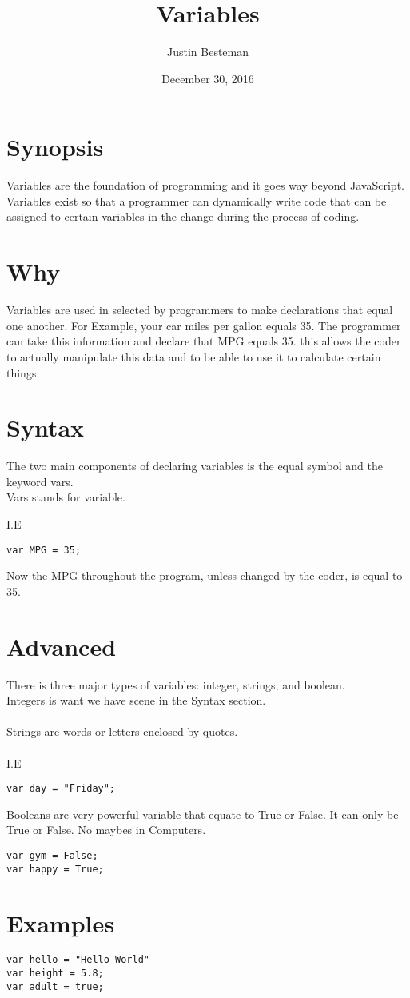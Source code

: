\documentclass[12pt, letterpaper]{article}
\title{Variables}
\author{Justin Besteman}
\date{December 30, 2016}
\begin{document}
\maketitle


\section*{Synopsis}

	 Variables are the foundation of programming and it goes way beyond JavaScript. Variables exist so that a programmer can dynamically write code that can be assigned to certain variables in the change during the process of coding. 

\section*{Why}

Variables are used in selected by programmers to make declarations that equal one another.  For Example, your car miles per gallon equals 35. The programmer can take this information and declare that MPG equals 35.  this allows the coder to actually manipulate this data and to be able to use it to calculate certain things. 

\section*{Syntax}

The two main components of declaring variables is the equal symbol and the keyword vars.\\
Vars stands for variable. 

I.E 

\begin{lstlisting}
var MPG = 35;
\end{lstlisting}
Now the MPG throughout the program, unless changed by the coder, is equal to 35.

\section*{Advanced}

There is three major types of variables: integer, strings, and boolean.\\
Integers is want we have scene in the Syntax section.\\ \\
Strings are words or letters enclosed by quotes.\\ \\
I.E \\
\begin{lstlisting}
var day = "Friday";
\end{lstlisting}
Booleans are very powerful variable that equate to True or False. It can only be True or False. No maybes in Computers.

\begin{lstlisting}
var gym = False;
var happy = True;
\end{lstlisting}


\section*{Examples}

\begin{lstlisting}
var hello = "Hello World"
var height = 5.8;
var adult = true;
\end{lstlisting}
\end{document}
